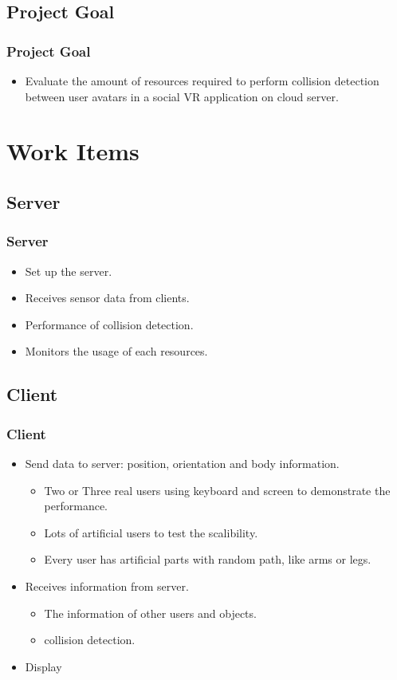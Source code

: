 \documentclass{beamer}
\begin{document}
\subsection{Project Goal}
	\begin{frame}
	\frametitle{Project Goal}
	\begin{itemize}
		\item Evaluate the amount of resources required to perform collision detection between user avatars in a social VR application on cloud server.
	\end{itemize}
	\end{frame}

\section{Work Items}

\subsection{Server}
	\begin{frame}
	\frametitle{Server}
	\begin{itemize}
		\item Set up the server.
		\item Receives sensor data from clients.
		\item Performance of collision detection.
		\item Monitors the usage of each resources.
	\end{itemize}
	\end{frame}

\subsection{Client}
	\begin{frame}
	\frametitle{Client}
	\begin{itemize}
		\item Send data to server: position, orientation and body information.
			\begin{itemize}
				\item Two or Three real users using keyboard and screen to demonstrate the performance.
				\item Lots of artificial users to test the scalibility.
				\item Every user has artificial parts with random path, like arms or legs.
			\end{itemize}
		\item Receives information from server.
			\begin{itemize}
				\item The information of other users and objects.
				\item collision detection.
			\end{itemize}
		\item Display
	\end{itemize}
	\end{frame}
\end{document}

